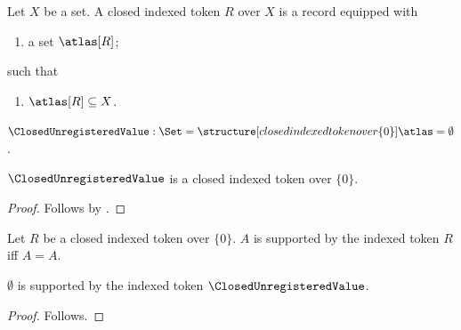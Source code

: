 

\begin{struct}\label{closed_indexed_token}
    Let $X$ be a set.
    A closed indexed token $R$ over $X$ is a record equipped with
    \begin{enumerate}
        \item a set $\atlas[R]$;
    \end{enumerate}
    such that
    \begin{enumerate}
        \item\label{closed_indexed_token_bound} $\atlas[R]\subseteq X$.
    \end{enumerate}
\end{struct}

\begin{definition}\label{closed_unregistered_value}
    $\ClosedUnregisteredValue:\Set=\structure[closed indexed token over \{0\}]{\atlas=\emptyset}$.
\end{definition}

\begin{proposition}\label{closed_unregistered_theorem}
    $\ClosedUnregisteredValue$ is a closed indexed token over $\{0\}$.
\end{proposition}
\begin{proof}
    Follows by .
\end{proof}

\begin{definition}\label{closed_unregistered_guard}
    Let $R$ be a closed indexed token over $\{0\}$.
    $A$ is supported by the indexed token $R$ iff $A=A$.
\end{definition}

\begin{proposition}\label{closed_unregistered_guard_rejected}
    $\emptyset$ is supported by the indexed token $\ClosedUnregisteredValue$.
\end{proposition}
\begin{proof}
    Follows.
\end{proof}
